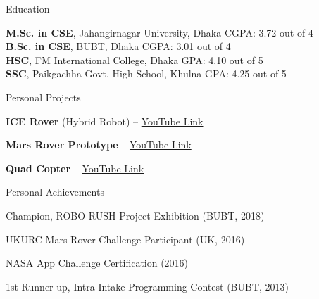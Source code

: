 \documentclass{resume}
\begin{document}
    \begin{rSection}{Education}

        \textbf{M.Sc. in CSE}, Jahangirnagar University, Dhaka \hfill CGPA: 3.72 out of 4\\[1em]
        \textbf{B.Sc. in CSE}, BUBT, Dhaka \hfill CGPA: 3.01 out of 4\\[1em]
        \textbf{HSC}, FM International College, Dhaka \hfill GPA: 4.10 out of 5\\[1em]
        \textbf{SSC}, Paikgachha Govt. High School, Khulna \hfill GPA: 4.25 out of 5

    \end{rSection}

    \begin{rSection}{Personal Projects}

        \item \textbf{ICE Rover} (Hybrid Robot) – \href{https://www.youtube.com/watch?v=-xZL5QeMJOA}{YouTube Link}
        \item \textbf{Mars Rover Prototype} – \href{https://www.youtube.com/watch?v=Ezm-PA_P74U}{YouTube Link}
        \item \textbf{Quad Copter} – \href{https://www.youtube.com/watch?v=P7Kv3u3oT5Q}{YouTube Link}

    \end{rSection}

    \begin{rSection}{Personal Achievements}
        \itemsep -2pt
        \item Champion, ROBO RUSH Project Exhibition (BUBT, 2018)
        \item UKURC Mars Rover Challenge Participant (UK, 2016)
        \item NASA App Challenge Certification (2016)
        \item 1st Runner-up, Intra-Intake Programming Contest (BUBT, 2013)
    \end{rSection}
\end{document}

